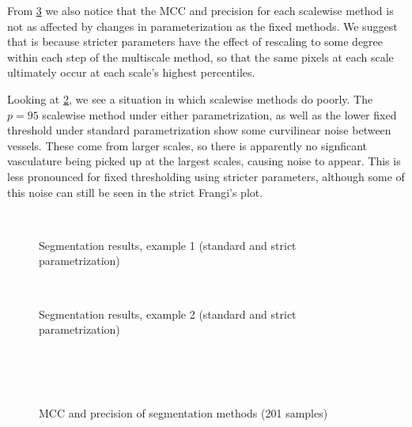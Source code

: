 From \cref{fig:scoring-boxplots} we also notice that the MCC and precision for each scalewise method is not as affected by changes in parameterization as the fixed methods. We suggest that is because stricter parameters have the effect of rescaling to some degree within each step of the multiscale method, so that the same pixels at each scale ultimately occur at each scale's highest percentiles.

Looking at \cref{fig:seg-montage-example2}, we see a situation in which scalewise methods do poorly. The $p=95$ scalewise method under either parametrization, as well as the lower fixed threshold under standard parametrization show some curvilinear noise between vessels. These come from larger scales, so there is apparently no signficant vasculature being picked up at the largest scales, causing noise to appear. This is less pronounced for fixed thresholding using stricter parameters, although some of this noise can still be seen in the strict Frangi's \Vmax plot.


\begin{figure}[p] \centering
   \\
  \caption{Segmentation results, example 1 (standard and strict parametrization)}
	\label{fig:seg-montage-example}
\end{figure}

\begin{figure}[p] \centering
	 \\[-0.5cm]
	\caption{Segmentation results, example 2 (standard and strict parametrization)}
	\label{fig:seg-montage-example2}
\end{figure}

\begin{figure}[p] \centering
   \\
   \\
   \\
      \caption{MCC and precision of segmentation methods (201 samples)}
      \label{fig:scoring-boxplots}
\end{figure}


